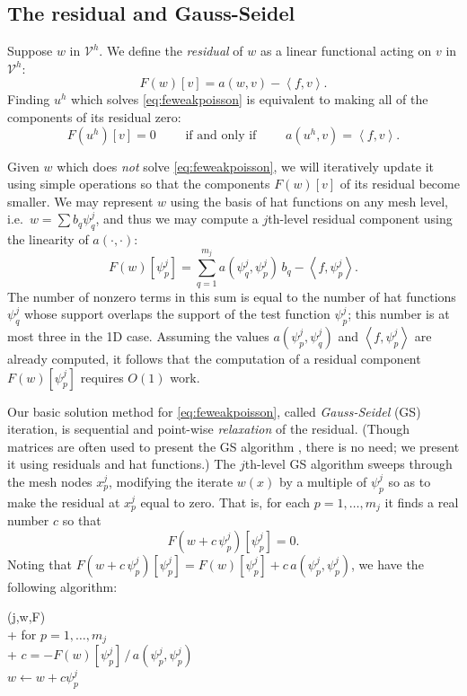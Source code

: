\documentclass[letterpaper,final,12pt,reqno]{amsart}
\theoremstyle{claim}
\newcommand{\ip}[2]{\left<#1,#2\right>}
\numberwithin{equation}{section}
\numberwithin{figure}{section}
\numberwithin{table}{section}
\numberwithin{theorem}{section}
\begin{document}
\subsection*{The residual and Gauss-Seidel}  Suppose $w$ in $\mathcal{V}^h$.  We define the \emph{residual} of $w$ as a linear functional acting on $v$ in $\mathcal{V}^h$:
\begin{equation}
  F(w)[v] = a(w,v) - \ip{f}{v}.  \label{eq:residual}
\end{equation}
Finding $u^h$ which solves \eqref{eq:feweakpoisson} is equivalent to making all of the components of its residual zero:
\begin{equation}
  F(u^h)[v]=0 \qquad \text{ if and only if } \qquad a(u^h,v)=\ip{f}{v}. \label{eq:residualweakequivalence}
\end{equation}

Given $w$ which does \emph{not} solve \eqref{eq:feweakpoisson}, we will iteratively update it using simple operations so that the components $F(w)[v]$ of its residual become smaller.  We may represent $w$ using the basis of hat functions on any mesh level, i.e.~$w = \sum b_q \psi_q^j$, and thus we may compute a $j$th-level residual component using the linearity of $a(\cdot,\cdot)$:
\begin{equation}
  F(w)[\psi_p^j] = \sum_{q=1}^{m_j} a(\psi_q^j,\psi_p^j) \,b_q - \ip{f}{\psi_p^j}.  \label{eq:residualpoisson}
\end{equation}
The number of nonzero terms in this sum is equal to the number of hat functions $\psi_q^j$ whose support overlaps the support of the test function $\psi_p^j$; this number is at most three in the 1D case.  Assuming the values $a(\psi_p^j,\psi_q^j)$ and $\ip{f}{\psi_p^j}$ are already computed, it follows that the computation of a residual component $F(w)[\psi_p^j]$ requires $O(1)$ work.

Our basic solution method for \eqref{eq:feweakpoisson}, called \emph{Gauss-Seidel} (GS) iteration, is sequential and point-wise \emph{relaxation} of the residual.  (Though matrices are often used to present the GS algorithm \cite[for example]{Bueler2021,Greenbaum1997}, there is no need; we present it using residuals and hat functions.)  The $j$th-level GS algorithm sweeps through the mesh nodes $x_p^j$, modifying the iterate $w(x)$ by a multiple of $\psi_p^j$ so as to make the residual at $x_p^j$ equal to zero.  That is, for each $p=1,\dots,m_j$ it finds a real number $c$ so that
\begin{equation}
  F(w+c\,\psi_p^j)[\psi_p^j] = 0.  \label{eq:gaussseidelpoint}
\end{equation}
Noting that $F(w+c\,\psi_p^j)[\psi_p^j] = F(w)[\psi_p^j] + c\, a(\psi_p^j,\psi_p^j)$, we have the following algorithm:
\begin{pseudo*}
(j,w,F)\text{:} \\+
    for $p=1,\dots,m_j$ \\+
        $\displaystyle c = - F(w)[\psi_p^j]\, \big/ \,a(\psi_p^j,\psi_p^j)$  \\
        $w \gets w + c \psi_p^j$
\end{pseudo*}
\end{document}
